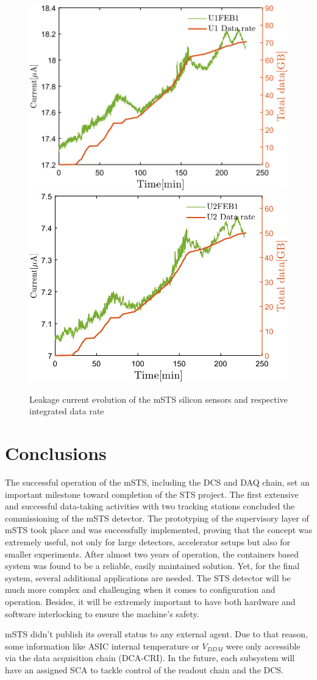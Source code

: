 \begin{figure}[!h]
\centering
\includegraphics[width=0.47\columnwidth]{Chapter6/DCS/images/U1_data_rate.png}
\includegraphics[width=0.47\columnwidth]{Chapter6/DCS/images/U2_data_rate.png}
\caption{Leakage current evolution of the \gls{mSTS} silicon sensors and respective integrated data rate}
\label{fig_Data}
\end{figure}

\section{Conclusions}

The successful operation of the \gls{mSTS}, including the \gls{DCS} and \gls{DAQ} chain, set an important milestone toward completion of the \gls{STS} project. The first extensive and successful data-taking activities with two tracking stations concluded the commissioning of the \gls{mSTS} detector. The prototyping of the supervisory layer of \gls{mSTS} took place and was successfully implemented, proving that the concept was extremely useful, not only for large detectors, accelerator setups but also for smaller experiments. After almost two years of operation, the containers based system was found to be a reliable, easily maintained solution. Yet, for the final system, several additional applications are needed. The \gls{STS} detector will be much more complex and challenging when it comes to configuration and operation. Besides, it will be extremely important to have both hardware and software interlocking to ensure the machine's safety.

\gls{mSTS} didn't publish its overall status to any external agent. Due to that reason, some information like \gls{ASIC} internal temperature or $V_{DDM}$ were only accessible via the data acquisition chain (\gls{DCA}-\gls{CRI}). In the future, each subsystem will have an assigned \gls{SCA} to tackle control of the readout chain and the \gls{DCS}. 


